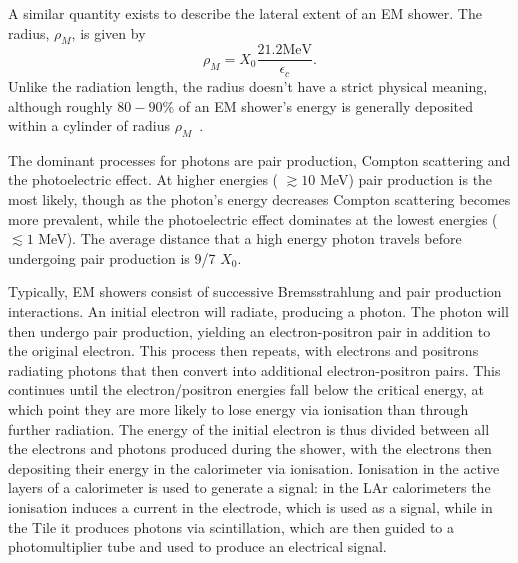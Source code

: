 A similar quantity exists to describe the lateral extent of an EM shower. The \moliere radius, $\rho_M$, is given by 
\begin{equation}
\rho_M = X_0 \frac{21.2 \mathrm{MeV}}{\epsilon_c}.
\end{equation}
Unlike the radiation length, the \moliere radius doesn't have a strict physical meaning, although roughly $80-90\%$ of an EM shower's energy is generally deposited within a cylinder of radius $\rho_M$~\cite{wigmans2000calorimetry}.


The dominant processes for photons are pair production, Compton scattering and the photoelectric effect. At higher energies ( $  \gtrsim 10$ MeV) pair production is the most likely, though as the photon's energy decreases Compton scattering becomes more prevalent, while the photoelectric effect dominates at the lowest energies ( $\lesssim 1$ MeV). The average distance that a high energy photon travels before undergoing pair production is 9/7 $X_0$.

Typically, EM showers consist of successive Bremsstrahlung and pair production interactions. An initial electron will radiate, producing a photon. The photon will then undergo pair production, yielding an electron-positron pair in addition to the original electron. This process then repeats, with electrons and positrons radiating photons that then convert into additional electron-positron pairs. This continues until the electron/positron energies fall below the critical energy, at which point they are more likely to lose energy via ionisation than through further radiation. The energy of the initial electron is thus divided between all the electrons and photons produced during the shower, with the electrons then depositing their energy in the calorimeter via ionisation. Ionisation in the active layers of a calorimeter is used to generate a signal: in the LAr calorimeters the ionisation induces a current in the electrode, which is used as a signal, while in the Tile it produces photons via scintillation, which are then guided to a photomultiplier tube and used to produce an electrical signal.
%
% 
%
%
%
%


